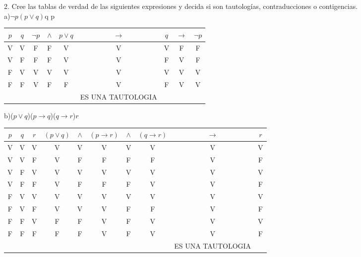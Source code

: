 \documentclass{article}
\begin{document}
2. Cree las tablas de verdad de las siguientes expresiones y decida si son tautologías, contraducciones o contigencias.\\

a)$\neg p$\wedge $(p \vee q)$\rightarrow q \rightarrow \neg p\\

\begin{center}
\begin{tabular}{|c|c|c|c|c|c|c|c|c|} \hline
  $p$ & $q$ & $\neg p$ & $\wedge$ & $p \vee q$ & $\rightarrow$ & $q$ & $\rightarrow$ & $\neg p$\\ \hline
  V & V & F & F & V & V & V & F & F \\ \hline
  V & F & F & F & V & V & F & V & F \\ \hline
  F & V & V & V & V & V & V & V & V \\ \hline
  F & F & V & F & F & V & F & V & V \\ \hline
 & & & & & ES UNA TAUTOLOGIA  & &  \\ \hline

\end{tabular}
\end{center}

b)($p \vee q$)\wedge ($p \rightarrow q$)\wedge ($q \rightarrow r$)\rightarrow $r$
\begin{center}
  \begin{tabular}{|c|c|c|c|c|c|c|c|c|c|}\hline
    $p$ & $q$ & $r$ & $(p \vee q)$ & $\wedge$ & $(p \rightarrow r)$ & $\wedge$ & $(q \rightarrow r)$ & $\rightarrow$ & $r$\\ \hline
    V & V & V & V & V & V & V & V & V & V\\ \hline
    V & V & F & V & F & F & F & F & V & F\\ \hline
    V & F & V & V & V & V & V & V & V & V\\ \hline
    V & F & F & V & F & F & F & V & V & F\\ \hline
    F & V & V & V & V & V & V & V & V & V\\ \hline
    F & V & F & V & V & V & F & F & V & F\\ \hline
    F & F & V & F & F & V & F & V & V & V\\ \hline
    F & F & F & F & F & V & F & V & V & F\\ \hline
    & & & & & & & & ES UNA TAUTOLOGIA & \\ \hline
  \end{tabular}
\end{center}
\\
\\
\\
\\
\\
\\
\\
\\
\\
\\
\\
\\
\\
\\
\end{document}
